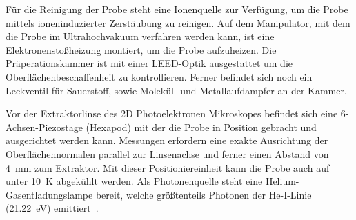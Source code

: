         Für die Reinigung der Probe steht eine Ionenquelle zur Verfügung, um die Probe mittels ioneninduzierter Zerstäubung zu reinigen.
        Auf dem Manipulator, mit dem die Probe im Ultrahochvakuum verfahren werden kann, ist eine Elektronenstoßheizung montiert, um die Probe aufzuheizen.
        Die Präperationskammer ist mit einer LEED-Optik ausgestattet um die Oberflächenbeschaffenheit zu kontrollieren.
        Ferner befindet sich noch ein Leckventil für Sauerstoff, sowie Molekül- und Metallaufdampfer an der Kammer.
        
        Vor der Extraktorlinse des 2D Photoelektronen Mikroskopes befindet sich eine 6-Achsen-Piezostage (Hexapod) mit der die Probe in Position gebracht und ausgerichtet werden kann.
        Messungen erfordern eine exakte Ausrichtung der Oberflächennormalen parallel zur Linsenachse und ferner einen Abstand von \SI{4}{\milli\meter} zum Extraktor.
        Mit dieser Positioniereinheit kann die Probe auch auf unter \SI{10}{\kelvin} abgekühlt werden.
        Als Photonenquelle steht eine Helium-Gasentladungslampe bereit, welche größtenteils Photonen der He-I-Linie (\SI{21.22}{\electronvolt}) emittiert~\cite{UVS}.